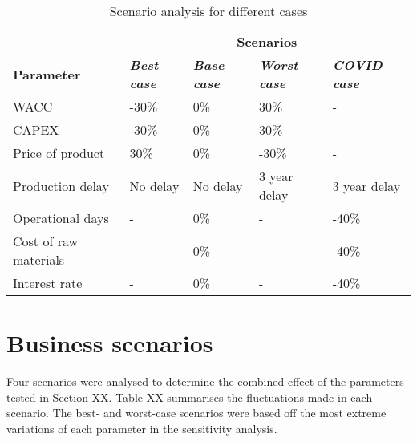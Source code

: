 
\begin{wraptable}{r}{10cm}
\centering
\caption{Scenario analysis for different cases}
\label{scenario_analysis}
\begin{tabular}{lllll}
\rowcolor[HTML]{D2F3FA} 
                      & \multicolumn{4}{c}{\cellcolor[HTML]{D2F3FA}\textbf{Scenarios}}                                                          \\
\rowcolor[HTML]{D2F3FA} 
\textbf{Parameter}    & \textit{\textbf{Best case}} & \textit{\textbf{Base case}} & \textit{\textbf{Worst case}} & \textit{\textbf{COVID case}} \\
WACC                  & -30\%                       & 0\%                         & 30\%                         & -                            \\
CAPEX                 & -30\%                       & 0\%                         & 30\%                         & -                            \\
Price of product      & 30\%                        & 0\%                         & -30\%                        & -                            \\
Production delay      & No delay                    & No delay                    & 3 year delay                 & 3 year delay                 \\
Operational days      & -                           & 0\%                         & -                            & -40\%                        \\
Cost of raw materials & -                           & 0\%                         & -                            & -40\%                        \\
Interest rate         & -                           & 0\%                         & -                            & -40\%                       
\end{tabular}
\end{wraptable}

\section{Business scenarios}
Four scenarios were analysed to determine the combined effect of the parameters tested in Section XX. Table XX summarises the fluctuations made in each scenario. The best- and worst-case scenarios were based off the most extreme variations of each parameter in the sensitivity analysis. 

